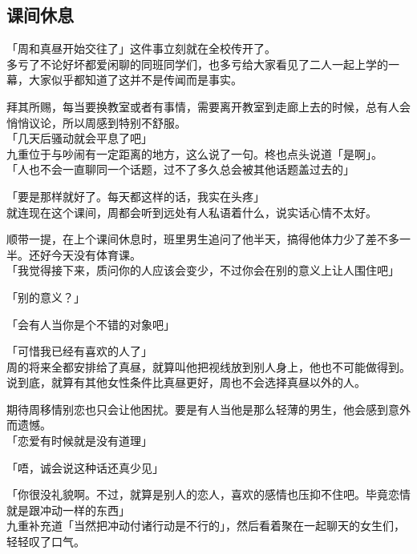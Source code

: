 \subsection{课间休息}

「周和真昼开始交往了」这件事立刻就在全校传开了。\\

多亏了不论好坏都爱闲聊的同班同学们，也多亏给大家看见了二人一起上学的一幕，大家似乎都知道了这并不是传闻而是事实。

拜其所赐，每当要换教室或者有事情，需要离开教室到走廊上去的时候，总有人会悄悄议论，所以周感到特别不舒服。\\

「几天后骚动就会平息了吧」\\

九重位于与吵闹有一定距离的地方，这么说了一句。柊也点头说道「是啊」。\\

「人也不会一直聊同一个话题，过不了多久总会被其他话题盖过去的」

「要是那样就好了。每天都这样的话，我实在头疼」\\

就连现在这个课间，周都会听到远处有人私语着什么，说实话心情不太好。

顺带一提，在上个课间休息时，班里男生追问了他半天，搞得他体力少了差不多一半。还好今天没有体育课。\\

「我觉得接下来，质问你的人应该会变少，不过你会在别的意义上让人围住吧」

「别的意义？」

「会有人当你是个不错的对象吧」

「可惜我已经有喜欢的人了」\\

周的将来全都安排给了真昼，就算叫他把视线放到别人身上，他也不可能做得到。说到底，就算有其他女性条件比真昼更好，周也不会选择真昼以外的人。

期待周移情别恋也只会让他困扰。要是有人当他是那么轻薄的男生，他会感到意外而遗憾。\\

「恋爱有时候就是没有道理」

「唔，诚会说这种话还真少见」

「你很没礼貌啊。不过，就算是别人的恋人，喜欢的感情也压抑不住吧。毕竟恋情就是跟冲动一样的东西」\\

九重补充道「当然把冲动付诸行动是不行的」，然后看着聚在一起聊天的女生们，轻轻叹了口气。\\

